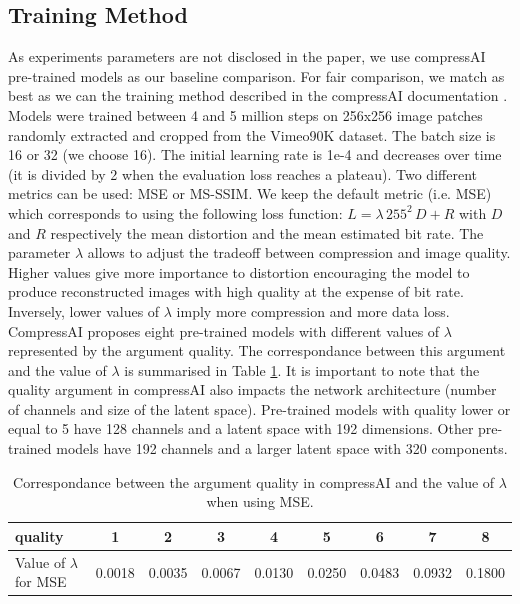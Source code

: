 \subsection{Training Method}
\label{training_method}
As experiments parameters are not disclosed in the paper, we use compressAI pre-trained models as our baseline comparison. For fair comparison, we match as best as we can the training method described in the compressAI documentation \cite{compressai_train}. Models were trained between 4 and 5 million steps on 256x256 image patches randomly extracted and cropped from the Vimeo90K dataset. The batch size is 16 or 32 (we choose 16). The initial learning rate is 1e-4 and decreases over time (it is divided by 2 when the evaluation loss reaches a plateau). Two different metrics can be used: MSE or MS-SSIM. We keep the default metric (i.e. MSE) which corresponds to using the following loss function: \(L = \lambda\, 255^{2}\, D + R\) with \(D\) and \(R\) respectively the mean distortion and the mean estimated bit rate. The parameter \(\lambda\) allows to adjust the tradeoff between compression and image quality. Higher values give more importance to distortion encouraging the model to produce reconstructed images with high quality at the expense of bit rate. Inversely, lower values of \(\lambda\) imply more compression and more data loss. CompressAI proposes eight pre-trained models with different values of \(\lambda\) represented by the argument \textsf{quality}. The correspondance between this argument and the value of \(\lambda\) is summarised in Table \ref{tab_quality_lambda}. It is important to note that the \textsf{quality} argument in compressAI also impacts the network architecture (number of channels and size of the latent space). Pre-trained models with \textsf{quality} lower or equal to 5 have 128 channels and a latent space with 192 dimensions. Other pre-trained models have 192 channels and a larger latent space with 320 components. 

\begin{table}[]
    \centering
    \begin{tabular}{|l|c|c|c|c|c|c|c|c|}
    \hline
    \textsf{quality}             & 1 & 2 & 3 & 4 & 5 & 6 & 7 & 8 \\ \hline
    Value of \(\lambda\) for MSE & 0.0018 & 0.0035 & 0.0067 & 0.0130 & 0.0250 & 0.0483 & 0.0932 & 0.1800 \\ \hline
    \end{tabular}
    \caption{Correspondance between the argument \textsf{quality} in compressAI and the value of \(\lambda\) when using MSE.}
    \label{tab_quality_lambda}
\end{table}

